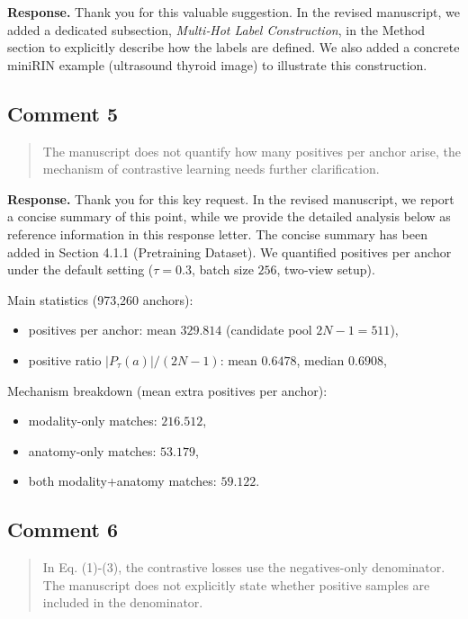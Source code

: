 \documentclass[11pt]{article}
\begin{document}
\textbf{Response.}
Thank you for this valuable suggestion.
In the revised manuscript, we added a dedicated subsection, \emph{Multi‑Hot Label Construction}, in the Method section to explicitly describe how the labels are defined.
We also added a concrete miniRIN example (ultrasound thyroid image) to illustrate this construction.

\subsection*{Comment 5}
\begin{quote}
The manuscript does not quantify how many positives per anchor arise, the mechanism of contrastive learning needs further clarification.
\end{quote}

\textbf{Response.}
Thank you for this key request.
In the revised manuscript, we report a concise summary of this point, while we provide the detailed analysis below as reference information in this response letter.
The concise summary has been added in Section 4.1.1 (Pretraining Dataset).
We quantified positives per anchor under the default setting (\(\tau=0.3\), batch size \(256\), two-view setup).

Main statistics (973,260 anchors):
\begin{itemize}[leftmargin=1.5em,noitemsep,topsep=0.3em]
\item positives per anchor: mean \(329.814\) (candidate pool \(2N-1=511\)),
\item positive ratio \(|P_\tau(a)|/(2N-1)\): mean \(0.6478\), median \(0.6908\),
\end{itemize}

Mechanism breakdown (mean extra positives per anchor):
\begin{itemize}[leftmargin=1.5em,noitemsep,topsep=0.3em]
\item modality-only matches: \(216.512\),
\item anatomy-only matches: \(53.179\),
\item both modality+anatomy matches: \(59.122\).
\end{itemize}

\subsection*{Comment 6}
\begin{quote}
In Eq. (1)-(3), the contrastive losses use the negatives-only denominator.
The manuscript does not explicitly state whether positive samples are included in the denominator.
\end{quote}
\end{document}

